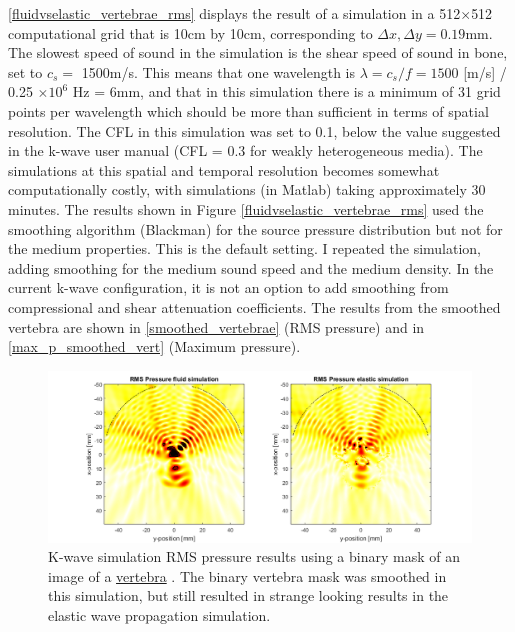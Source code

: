 \documentclass[10pt,a4paper]{article}
\begin{document}
\autoref{fluidvselastic_vertebrae_rms} displays the result of a simulation in a 512$\times$512 computational grid that is 10cm by 10cm, corresponding to $\Delta x, \Delta y = 0.19$mm. The slowest speed of sound in the simulation is the shear speed of sound in bone, set to $c_s = $ 1500m/s. This means that one wavelength is $\lambda = c_s / f = 1500$ [m/s] / 0.25 $\times 10^6$ Hz = 6mm, and that in this simulation there is a minimum of 31 grid points per wavelength which should be more than sufficient in terms of spatial resolution.  The CFL in this simulation was set to 0.1, below the value suggested in the k-wave user manual (CFL = 0.3 for weakly heterogeneous media). The simulations at this spatial and temporal resolution becomes somewhat computationally costly, with simulations (in Matlab) taking approximately 30 minutes. The results shown in Figure \ref{fluidvselastic_vertebrae_rms} used the smoothing algorithm (Blackman) for the source pressure distribution but not for the medium properties. This is the default setting. I repeated the simulation, adding smoothing for the medium sound speed and the medium density. In the current k-wave configuration, it is not an option to add smoothing from compressional and shear attenuation coefficients. The results from the smoothed vertebra are shown in \autoref{smoothed_vertebrae} (RMS pressure) and in \autoref{max_p_smoothed_vert} (Maximum pressure).

\begin{figure}[H]
\hspace*{-4cm}
\includegraphics[scale=0.7]{smoothed_vertebrae}
\caption{K-wave simulation RMS pressure results using a binary mask of an image of a \href{https://www.cedars-sinai.edu/Patients/Programs-and-Services/Spine-Center/The-Patient-Guide/Anatomy-of-the-Spine/Vertebrae-of-the-Spine.aspx}{vertebra} . The binary vertebra mask was smoothed in this simulation, but still resulted in strange looking results in the elastic wave propagation simulation.}\label{smoothed_vertebrae}
\end{figure} 
\end{document}
